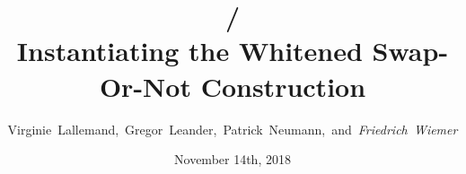 \documentclass[%
    10pt,
    professionalfont,
    aspectratio=169,
]{beamer}
\title[\bison/ -- Instantiating the Whitened Swap-Or-Not Construction]{\bison/\\ Instantiating the Whitened Swap-Or-Not Construction}
\subtitle{}
\author[Friedrich~Wiemer]{\mbox{Virginie~Lallemand, Gregor~Leander, Patrick~Neumann, and \emph{Friedrich~Wiemer}}}
\institute{%
    FluxFingers\\[0.5em]
    Workgroup Symmetric Cryptography, Ruhr University Bochum
}
\date{November 14th, 2018}
\begin{document}
\begin{frame}
    \titlepage{}
\end{frame}


\end{document}
